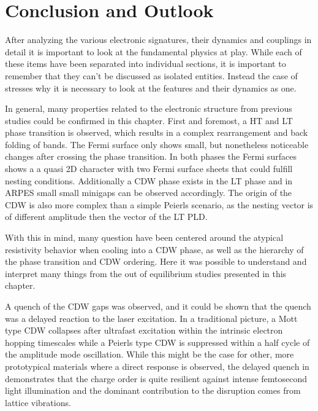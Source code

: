 \section{Conclusion and Outlook}

After analyzing the various electronic signatures, their dynamics and couplings in detail it is important to look at the fundamental physics at play.
While each of these items have been separated into individual sections, it is important to remember that they can't be discussed as isolated entities.
Instead the case of  stresses why it is necessary to look at the features and their dynamics as one.

In general, many properties related to the electronic structure from previous studies could be confirmed in this chapter.
First and foremost, a HT and LT phase transition is observed, which results in a complex rearrangement and back folding of bands.
The Fermi surface only shows small, but nonetheless noticeable changes after crossing the phase transition.
In both phases the Fermi surfaces shows a a quasi 2D character with two Fermi surface sheets that could fulfill nesting conditions.
Additionally a CDW phase exists in the LT phase and in ARPES small small minigaps can be observed accordingly.
The origin of the CDW is also more complex than a simple Peierls scenario, as the nesting vector is of different amplitude then the vector of the LT PLD.

With this in mind, many question have been centered around the atypical resistivity behavior when cooling into a CDW phase, as well as the hierarchy of the phase transition and CDW ordering.
Here it was possible to understand and interpret many things from the out of equilibrium studies presented in this chapter.

A quench of the CDW gaps was observed, and it could be shown that the quench was a delayed reaction to the laser excitation.
In a traditional picture, a Mott type CDW collapses after ultrafast excitation within the intrinsic electron hopping timescales while a Peierls type CDW is suppressed within a half cycle of the amplitude mode oscillation.
While this might be the case for other, more prototypical materials where a direct response is observed, the delayed quench in  demonstrates that the charge order is quite resilient against intense femtosecond light illumination and the dominant contribution to the disruption comes from lattice vibrations.

